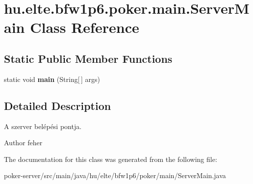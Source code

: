 \hypertarget{classhu_1_1elte_1_1bfw1p6_1_1poker_1_1main_1_1_server_main}{}\section{hu.\+elte.\+bfw1p6.\+poker.\+main.\+Server\+Main Class Reference}
\label{classhu_1_1elte_1_1bfw1p6_1_1poker_1_1main_1_1_server_main}
\subsection*{Static Public Member Functions}
\begin{DoxyCompactItemize}
\item 
\hypertarget{classhu_1_1elte_1_1bfw1p6_1_1poker_1_1main_1_1_server_main_a3202b778b0da3b0ac65915bf4337d7ce}{}static void {\bfseries main} (String\mbox{[}$\,$\mbox{]} args)\label{classhu_1_1elte_1_1bfw1p6_1_1poker_1_1main_1_1_server_main_a3202b778b0da3b0ac65915bf4337d7ce}

\end{DoxyCompactItemize}


\subsection{Detailed Description}
A szerver belépési pontja. \begin{DoxyAuthor}{Author}
feher 
\end{DoxyAuthor}


The documentation for this class was generated from the following file\+:\begin{DoxyCompactItemize}
\item 
poker-\/server/src/main/java/hu/elte/bfw1p6/poker/main/Server\+Main.\+java\end{DoxyCompactItemize}
